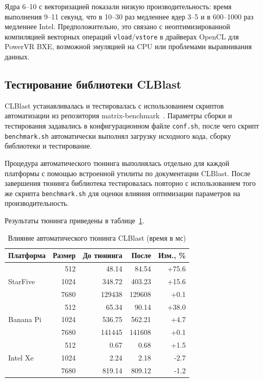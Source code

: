 Ядра 6--10 с векторизацией показали низкую производительность: время выполнения 9--11 секунд, что в 10--30 раз медленнее ядер 3--5 и в 600--1000 раз медленнее Intel. Предположительно, это связано с неоптимизированной компиляцией векторных операций \texttt{vload}/\texttt{vstore} в драйверах OpenCL для PowerVR BXE, возможной эмуляцией на CPU или проблемами выравнивания данных.

\subsection{Тестирование библиотеки CLBlast}

CLBlast устанавливалась и тестировалась с использованием скриптов автоматизации из репозитория matrix-benchmark~\cite{matrix_benchmark_repo}. Параметры сборки и тестирования задавались в конфигурационном файле \texttt{conf.sh}, после чего скрипт \texttt{benchmark.sh} автоматически выполнял загрузку исходного кода, сборку библиотеки и тестирование.

Процедура автоматического тюнинга выполнялась отдельно для каждой платформы с помощью встроенной утилиты по документации CLBlast. После завершения тюнинга библиотека тестировалась повторно с использованием того же скрипта \texttt{benchmark.sh} для оценки влияния оптимизации параметров на производительность.

Результаты тюнинга приведены в таблице~\ref{tab:tuning_effect}.

\begin{table}[h!]
\centering
\caption{Влияние автоматического тюнинга CLBlast (время в мс)}
\label{tab:tuning_effect}
\begin{tabular}{|l|r|r|r|r|}
\hline
\textbf{Платформа} & \textbf{Размер} & \textbf{До тюнинга} & \textbf{После} & \textbf{Изм., \%} \\
\hline
\multirow{3}{*}{StarFive} & 512 & 48.14 & 84.54 & +75.6 \\
 & 1024 & 348.72 & 403.23 & +15.6 \\
 & 7680 & 129438 & 129608 & +0.1 \\
\hline
\multirow{3}{*}{Banana Pi} & 512 & 65.34 & 90.14 & +38.0 \\
 & 1024 & 536.75 & 562.21 & +4.7 \\
 & 7680 & 141445 & 141608 & +0.1 \\
\hline
\multirow{3}{*}{Intel Xe} & 512 & 0.67 & 0.68 & +1.5 \\
 & 1024 & 2.24 & 2.18 & -2.7 \\
 & 7680 & 819.14 & 809.12 & -1.2 \\
\hline
\end{tabular}
\end{table}

